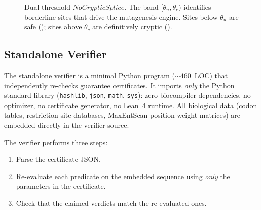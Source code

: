 \begin{figure}[t]
\centering
{}
\caption{Dual-threshold $\mathit{NoCrypticSplice}$.
         The \UNCERTAIN{} band $[\theta_u, \theta_c)$ identifies
         borderline sites that drive the mutagenesis engine.
         Sites below $\theta_u$ are safe (\PASS); sites above
         $\theta_c$ are definitively cryptic (\FAIL).}
\label{fig:dualthresh}
\end{figure}

\subsection{Standalone Verifier}\label{sec:verifier}

The standalone verifier is a minimal Python program (${\sim}460$~LOC)
that independently re-checks guarantee certificates.
It imports \emph{only} the Python standard library
(\texttt{hashlib}, \texttt{json}, \texttt{math}, \texttt{sys}):
zero biocompiler dependencies, no optimizer, no certificate generator,
no Lean~4 runtime.
All biological data (codon tables, restriction site databases,
MaxEntScan position weight matrices) are embedded directly in the
verifier source.

The verifier performs three steps:
\begin{enumerate}[leftmargin=*,itemsep=0pt,topsep=1pt]
\item Parse the certificate JSON.
\item Re-evaluate each predicate on the embedded sequence using
      \emph{only} the parameters in the certificate.
\item Check that the claimed verdicts match the re-evaluated ones.
\end{enumerate}

